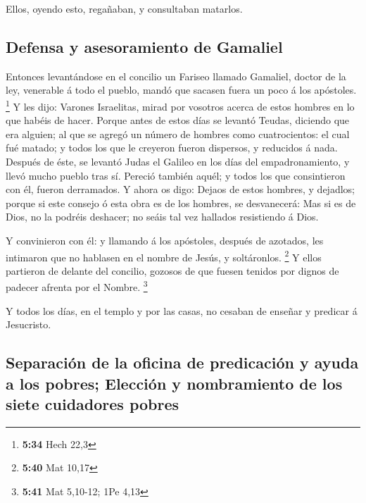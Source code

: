  Ellos, oyendo esto, regañaban, y consultaban matarlos.

\hypertarget{defensa-y-asesoramiento-de-gamaliel}{%
\subsection{Defensa y asesoramiento de
Gamaliel}\label{defensa-y-asesoramiento-de-gamaliel}}

 Entonces levantándose en el concilio un Fariseo llamado
Gamaliel, doctor de la ley, venerable á todo el pueblo, mandó que
sacasen fuera un poco á los apóstoles. \footnote{\textbf{5:34} Hech 22,3}
 Y les dijo: Varones Israelitas, mirad por vosotros acerca
de estos hombres en lo que habéis de hacer.  Porque antes
de estos días se levantó Teudas, diciendo que era alguien; al que se
agregó un número de hombres como cuatrocientos: el cual fué matado; y
todos los que le creyeron fueron dispersos, y reducidos á nada.
 Después de éste, se levantó Judas el Galileo en los días
del empadronamiento, y llevó mucho pueblo tras sí. Pereció también
aquél; y todos los que consintieron con él, fueron derramados.
 Y ahora os digo: Dejaos de estos hombres, y dejadlos;
porque si este consejo ó esta obra es de los hombres, se desvanecerá:
 Mas si es de Dios, no la podréis deshacer; no seáis tal
vez hallados resistiendo á Dios.

 Y convinieron con él: y llamando á los apóstoles, después
de azotados, les intimaron que no hablasen en el nombre de Jesús, y
soltáronlos. \footnote{\textbf{5:40} Mat 10,17}  Y ellos
partieron de delante del concilio, gozosos de que fuesen tenidos por
dignos de padecer afrenta por el Nombre. \footnote{\textbf{5:41} Mat
  5,10-12; 1Pe 4,13}

 Y todos los días, en el templo y por las casas, no cesaban
de enseñar y predicar á Jesucristo.

\hypertarget{separaciuxf3n-de-la-oficina-de-predicaciuxf3n-y-ayuda-a-los-pobres-elecciuxf3n-y-nombramiento-de-los-siete-cuidadores-pobres}{%
\subsection{Separación de la oficina de predicación y ayuda a los
pobres; Elección y nombramiento de los siete cuidadores
pobres}\label{separaciuxf3n-de-la-oficina-de-predicaciuxf3n-y-ayuda-a-los-pobres-elecciuxf3n-y-nombramiento-de-los-siete-cuidadores-pobres}}

